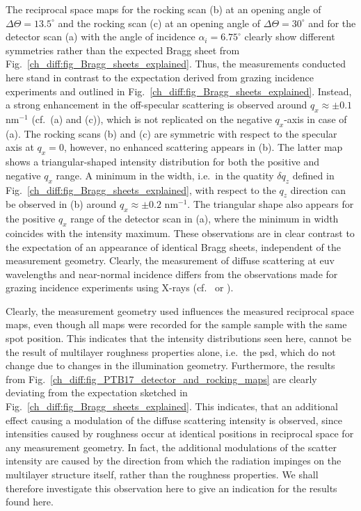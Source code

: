 The reciprocal space maps for the rocking scan (b) at an opening angle of $\Delta \Theta = 13.5^\circ$ and the rocking scan (c) at an opening angle of $\Delta \Theta = 30^\circ$ and for the detector scan (a) with the angle of incidence $\alpha_i = 6.75^\circ$ clearly show different symmetries rather than the expected Bragg sheet from Fig.~\ref{ch_diff:fig_Bragg_sheets_explained}. Thus, the measurements conducted here stand in contrast to the expectation derived from grazing incidence experiments and outlined in Fig.~\ref{ch_diff:fig_Bragg_sheets_explained}. Instead, a strong enhancement in the off-specular scattering is observed around $q_x\approx \pm 0.1$ nm$^{-1}$ (cf.~(a) and (c)), which is not replicated on the negative $q_x$-axis in case of (a). The rocking scans (b) and (c) are symmetric with respect to the specular axis at $q_x=0$, however, no enhanced scattering appears in (b). The latter map shows a triangular-shaped intensity distribution for both the positive and negative $q_x$ range. A minimum in the width, i.e.~in the quatity $\delta q_z$ defined in Fig.~\ref{ch_diff:fig_Bragg_sheets_explained}, with respect to the $q_z$ direction can be observed in (b) around $q_x \approx \pm 0.2$ nm$^{-1}$. The triangular shape also appears for the positive $q_x$ range of the detector scan in (a), where the minimum in width coincides with the intensity maximum. These observations are in clear contrast to the expectation of an appearance of identical Bragg sheets, independent of the measurement geometry. Clearly, the measurement of diffuse scattering at \gls{euv} wavelengths and near-normal incidence differs from the observations made for grazing incidence experiments using X-rays (cf.~\textcite{salditt_kinetic_1994} or \textcite{jiang_nonspecular_1992}).

Clearly, the measurement geometry used influences the measured reciprocal space maps, even though all maps were recorded for the sample sample with the same spot position. This indicates that the intensity distributions seen here, cannot be the result of multilayer roughness properties alone, i.e.~the \gls{psd}, which do not change due to changes in the illumination geometry. Furthermore, the results from Fig.~\ref{ch_diff:fig_PTB17_detector_and_rocking_maps} are clearly deviating from the expectation sketched in Fig.~\ref{ch_diff:fig_Bragg_sheets_explained}. This indicates, that an additional effect causing a modulation of the diffuse scattering intensity is observed, since intensities caused by roughness occur at identical positions in reciprocal space for any measurement geometry. In fact, the additional modulations of the scatter intensity are caused by the direction from which the radiation impinges on the multilayer structure itself, rather than the roughness properties. We shall therefore investigate this observation here to give an indication for the results found here.

